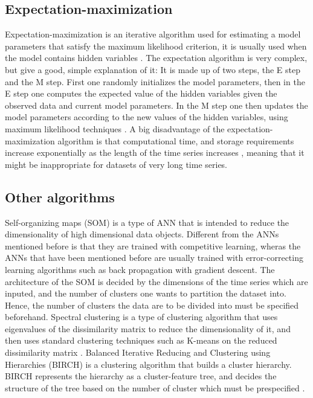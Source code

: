 \subsection{Expectation-maximization}
Expectation-maximization is an iterative algorithm used for estimating a model parameters that satisfy the maximum likelihood criterion,
it is usually used when the model contains hidden variables \cite{em_wikipedia}. 
The expectation algorithm is very complex, but \textcite{mixture_gaussian_hmm} give a good, simple explanation of it:
It is made up of two steps, the E step and the M step. 
First one randomly initializes the model parameters, then in the E step one computes the expected value of the hidden variables given the observed data and current model parameters.
In the M step one then updates the model parameters according to the new values of the hidden variables, using maximum likelihood techniques \cite{em_wikipedia}.
A big disadvantage of the expectation-maximization algorithm is that computational time, and storage requirements increase exponentially as the length of the time series increases \cite{mixture_gaussian_hmm},
meaning that it might be inappropriate for datasets of very long time series. 

\subsection{Other algorithms}
Self-organizing maps (SOM) is a type of ANN that is intended to reduce the dimensionality of high dimensional data objects.
Different from the ANNs mentioned before is that they are trained with competitive learning, wheras the ANNs that have been mentioned before are usually trained with error-correcting learning algorithms such as back propagation with gradient descent. \cite{som_wikipedia}
The architecture of the SOM is decided by the dimensions of the time series which are inputed, and the number of clusters one wants to partition the dataset into.
Hence, the number of clusters the data are to be divided into must be specified beforehand. 
Spectral clustering is a type of clustering algorithm that uses eigenvalues of the dissimilarity matrix to reduce the dimensionality of it, 
and then uses standard clustering techniques such as K-means on the reduced dissimilarity matrix \cite{spectral_cl_wikipedia}.
Balanced Iterative Reducing and Clustering using Hierarchies (BIRCH) is a clustering algorithm that builds a cluster hierarchy. 
BIRCH represents the hierarchy as a cluster-feature tree, and decides the structure of the tree based on the number of cluster which must be prespecified \cite{birch_wikipedia}.

